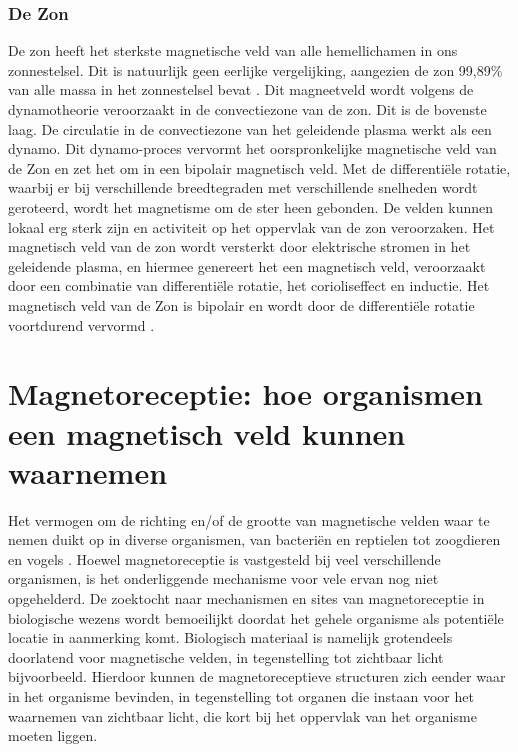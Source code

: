 \documentclass[12pt,a4paper]{article}
\begin{document}
\subsubsection*{De Zon}
De zon heeft het sterkste magnetische veld van alle hemellichamen in ons zonnestelsel.
Dit is natuurlijk geen eerlijke vergelijking, aangezien de zon 99,89\% van alle massa in het zonnestelsel bevat \cite{olaf_12}.
Dit magneetveld wordt volgens de dynamotheorie veroorzaakt in de convectiezone van de zon. Dit is de bovenste laag.
De circulatie in de convectiezone van het geleidende plasma werkt als een dynamo. Dit dynamo-proces vervormt het oorspronkelijke magnetische veld van de Zon en zet het om in een bipolair magnetisch veld.
Met de differentiële rotatie, waarbij er bij verschillende breedtegraden met verschillende snelheden wordt geroteerd, wordt het magnetisme om de ster heen gebonden.
De velden kunnen lokaal erg sterk zijn en activiteit op het oppervlak van de zon veroorzaken.
Het magnetisch veld van de zon wordt versterkt door elektrische stromen in het geleidende plasma, en hiermee genereert het een magnetisch veld, veroorzaakt door een combinatie van differentiële rotatie, het corioliseffect en inductie.
Het magnetisch veld van de Zon is bipolair en wordt door de differentiële rotatie voortdurend vervormd \cite{olaf_13}.

\newpage
\section{Magnetoreceptie: hoe organismen een magnetisch veld kunnen waarnemen}
Het vermogen om de richting en/of de grootte van magnetische velden waar te nemen duikt op in diverse organismen, van bacteriën en reptielen tot zoogdieren en vogels 
\cite{ijmert_annual_reviews, ijmert_open_life_sciences}.
Hoewel magnetoreceptie is vastgesteld bij veel verschillende organismen, is het onderliggende mechanisme voor vele ervan nog niet opgehelderd.
De zoektocht naar mechanismen en sites van magnetoreceptie in biologische wezens wordt bemoeilijkt doordat het gehele organisme als potentiële locatie in aanmerking komt.
Biologisch materiaal is namelijk grotendeels doorlatend voor magnetische velden, in tegenstelling tot zichtbaar licht bijvoorbeeld.
Hierdoor kunnen de magnetoreceptieve structuren zich eender waar in het organisme bevinden, in tegenstelling tot organen die instaan voor het waarnemen van zichtbaar licht, die kort bij het oppervlak van het organisme moeten liggen.
\end{document}
